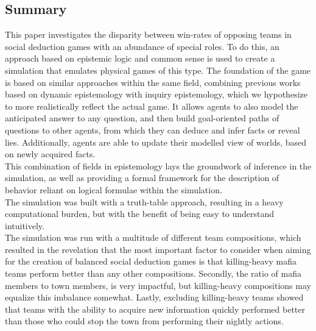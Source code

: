 \onecolumn
\begin{center}
	\section*{Summary}\label{sec:summary}
\end{center}
This paper investigates the disparity between win-rates of opposing teams in
social deduction games with an abundance of special roles. To do  this, an
approach based on epistemic logic and common sense is used to create a
simulation that emulates physical games of this type. The foundation of the
game is based on similar approaches within the same field, combining previous works based on dynamic epistemology with inquiry epistemology,
which we hypothesize to more realistically reflect the actual game. It allows agents to also model the anticipated answer to any question, and then build goal-oriented
paths of questions to other agents, from which they can deduce and infer facts or reveal lies. Additionally, agents are able to update their modelled view of worlds, based on newly acquired facts. \\
This combination of fields in epistemology lays the groundwork of inference in the simulation, 
as well as providing a formal framework for the description of behavior 
reliant on logical formulae within the simulation. \\
The simulation was built with a truth-table approach, resulting in a heavy
computational burden, but with the benefit of being easy to understand
intuitively. \\
The simulation was run with a multitude of different team compositions, which
resulted in the revelation that the most important factor to consider when
aiming for the creation of balanced social deduction games is that killing-heavy mafia teams perform better than any other compositions. Secondly, the ratio of mafia members to town members, is very impactful, but killing-heavy compositions may equalize this imbalance somewhat. Lastly, excluding killing-heavy teams showed that teams with the ability to acquire new information quickly performed better than those who could stop the town from performing their nightly actions. 
\twocolumn